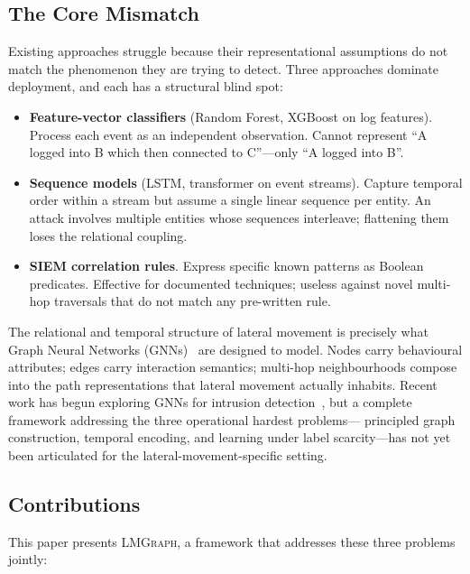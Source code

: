 \documentclass[sigconf,nonacm]{acmart}
\begin{document}
\subsection{The Core Mismatch}

Existing approaches struggle because their representational assumptions do not
match the phenomenon they are trying to detect. Three approaches dominate
deployment, and each has a structural blind spot:

\begin{itemize}
  \item \textbf{Feature-vector classifiers} (Random Forest, XGBoost on log
        features). Process each event as an independent observation. Cannot
        represent ``A logged into B which then connected to C''---only
        ``A logged into B''.
  \item \textbf{Sequence models} (LSTM, transformer on event streams). Capture
        temporal order within a stream but assume a single linear sequence per
        entity. An attack involves multiple entities whose sequences interleave;
        flattening them loses the relational coupling.
  \item \textbf{SIEM correlation rules}. Express specific known patterns as
        Boolean predicates. Effective for documented techniques; useless against
        novel multi-hop traversals that do not match any pre-written rule.
\end{itemize}

The relational and temporal structure of lateral movement is precisely what
Graph Neural Networks (GNNs)~\cite{kipf2017gcn,hamilton2017graphsage,velickovic2018gat}
are designed to model. Nodes carry behavioural attributes; edges carry
interaction semantics; multi-hop neighbourhoods compose into the path
representations that lateral movement actually inhabits. Recent work has begun
exploring GNNs for intrusion detection~\cite{lo2022eGraphSAGE,king2023unicorn},
but a complete framework addressing the three operational hardest problems---
principled graph construction, temporal encoding, and learning under label
scarcity---has not yet been articulated for the lateral-movement-specific
setting.

\subsection{Contributions}

This paper presents \textsc{LMGraph}, a framework that addresses these three
problems jointly:
\end{document}
